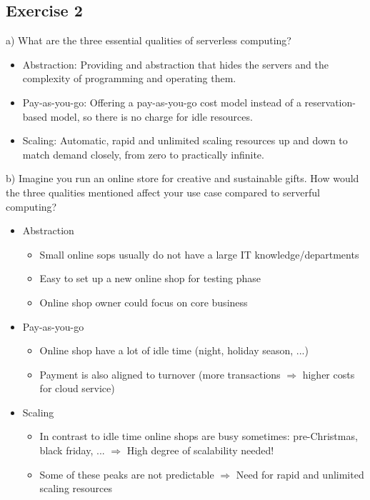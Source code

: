 \documentclass{article}
\begin{document}
\subsection{Exercise 2}
a) What are the three essential qualities of serverless computing?
\begin{itemize}
    \item Abstraction: Providing and abstraction that hides the servers and the complexity of programming and operating them.
    \item Pay-as-you-go: Offering a pay-as-you-go cost model instead of a reservation-based model, so there is no charge for idle resources.
    \item Scaling: Automatic, rapid and unlimited scaling resources up and down to match demand closely, from zero to practically infinite.
\end{itemize}
b) Imagine you run an online store for creative and sustainable gifts. How would the three qualities mentioned affect your use case compared to serverful computing?
\begin{itemize}
    \item Abstraction
          \begin{itemize}
              \item Small online sops usually do not have a large IT knowledge/departments
              \item Easy to set up a new online shop for testing phase
              \item Online shop owner could focus on core business
          \end{itemize}
    \item Pay-as-you-go
          \begin{itemize}
              \item Online shop have a lot of idle time (night, holiday season, ...)
              \item Payment is also aligned to turnover (more transactions \(\Rightarrow\) higher costs for cloud service)
          \end{itemize}
    \item Scaling
          \begin{itemize}
              \item In contrast to idle time online shops are busy sometimes: pre-Christmas, black friday, ... \(\Rightarrow\) High degree of scalability needed!
              \item Some of these peaks are not predictable \(\Rightarrow\) Need for rapid and unlimited scaling resources
          \end{itemize}
\end{itemize}
\end{document}
